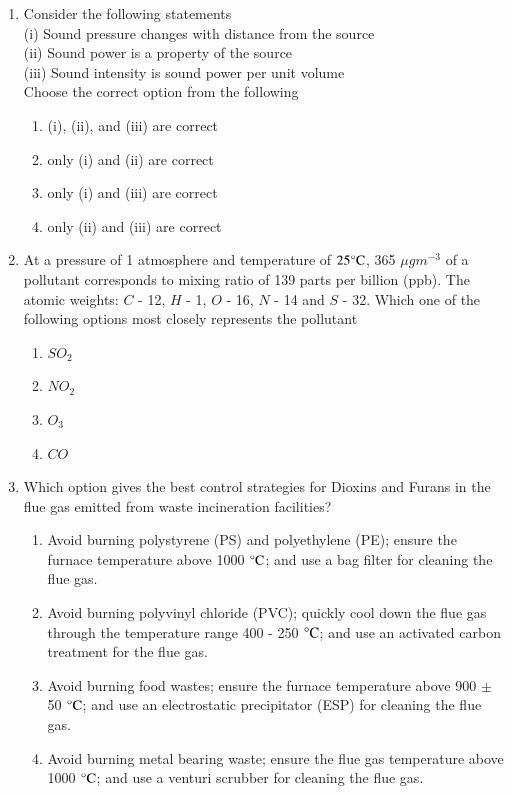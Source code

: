 \documentclass[journal]{IEEEtran}
\begin{document}
\begin{enumerate}[resume]
\item Consider the following statements \\
(i) Sound pressure changes with distance from the source \\
(ii) Sound power is a property of the source \\
(iii) Sound intensity is sound power per unit volume \\
Choose the correct option from the following
\hfill{}
\begin{enumerate}
\item (i), (ii), and (iii) are correct
\item only (i) and (ii) are correct
\item only (i) and (iii) are correct
\item only (ii) and (iii) are correct
\end{enumerate}

\item At a pressure of 1 atmosphere and temperature of $25\celsius$, 365 $\mu g m^{-3}$ of a pollutant corresponds to mixing ratio of 139 parts per billion (ppb). The atomic weights: $C$ - 12, $H$ - 1, $O$ - 16, $N$ - 14 and $S$ - 32. Which one of the following options most closely represents the pollutant
\hfill{}
\begin{enumerate}
\item $SO_2$
\item $NO_2$
\item $O_3$
\item $CO$
\end{enumerate}

\item Which option gives the best control strategies for Dioxins and Furans in the flue gas emitted from waste incineration facilities?
\hfill{}
\begin{enumerate}
\item Avoid burning polystyrene (PS) and polyethylene (PE); ensure the furnace temperature above 1000 $\celsius$; and use a bag filter for cleaning the flue gas.
\item Avoid burning polyvinyl chloride (PVC); quickly cool down the flue gas through the temperature range 400 - 250 $\celsius$; and use an activated carbon treatment for the flue gas.
\item Avoid burning food wastes; ensure the furnace temperature above 900 $\pm$ 50 $\celsius$; and use an electrostatic precipitator (ESP) for cleaning the flue gas.
\item Avoid burning metal bearing waste; ensure the flue gas temperature above 1000 $\celsius$; and use a venturi scrubber for cleaning the flue gas.
\end{enumerate}


\end{enumerate}
\end{document}
